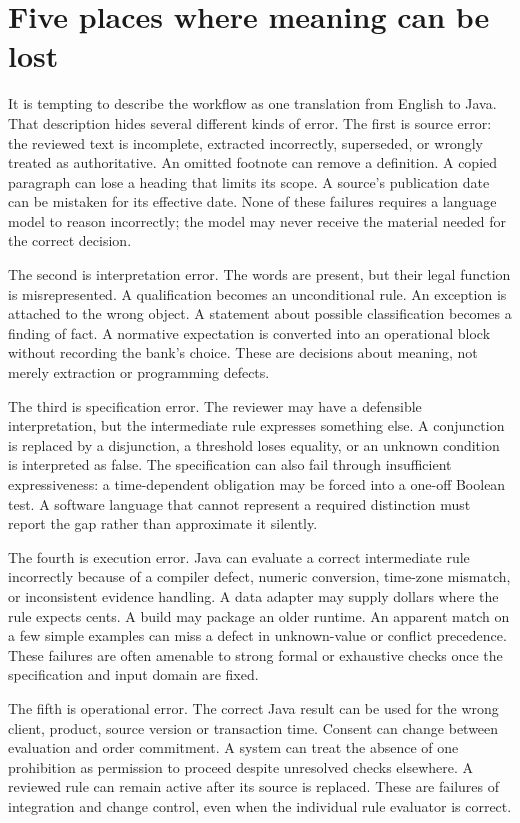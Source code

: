 \section{Five places where meaning can be lost}
\label{merge:M01:02}

\label{sec:problem-boundaries}
It is tempting to describe the workflow as one translation from English to
Java. That description hides several different kinds of error. The first is
source error: the reviewed text is incomplete, extracted incorrectly, superseded,
or wrongly treated as authoritative. An omitted footnote can remove a definition.
A copied paragraph can lose a heading that limits its scope. A source's
publication date can be mistaken for its effective date. None of these failures
requires a language model to reason incorrectly; the model may never receive
the material needed for the correct decision.

The second is interpretation error. The words are present, but their legal
function is misrepresented. A qualification becomes an unconditional rule. An
exception is attached to the wrong object. A statement about possible
classification becomes a finding of fact. A normative expectation is converted
into an operational block without recording the bank's choice. These are
decisions about meaning, not merely extraction or programming defects.

The third is specification error. The reviewer may have a defensible
interpretation, but the intermediate rule expresses something else. A conjunction
is replaced by a disjunction, a threshold loses equality, or an unknown condition
is interpreted as false. The specification can also fail through insufficient
expressiveness: a time-dependent obligation may be forced into a one-off Boolean
test. A software language that cannot represent a required distinction must
report the gap rather than approximate it silently.

The fourth is execution error. Java can evaluate a correct intermediate rule
incorrectly because of a compiler defect, numeric conversion, time-zone mismatch,
or inconsistent evidence handling. A data adapter may supply dollars where the
rule expects cents. A build may package an older runtime. An apparent match on a
few simple examples can miss a defect in unknown-value or conflict precedence.
These failures are often amenable to strong formal or exhaustive checks once
the specification and input domain are fixed.

The fifth is operational error. The correct Java result can be used for the
wrong client, product, source version or transaction time. Consent can change
between evaluation and order commitment. A system can treat the absence of one
prohibition as permission to proceed despite unresolved checks elsewhere. A
reviewed rule can remain active after its source is replaced. These are failures
of integration and change control, even when the individual rule evaluator is
correct.

